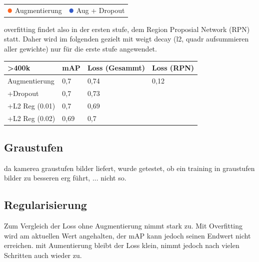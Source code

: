 \begin{table}[htb]
  \centering
  \begin{tabular}{m{}l}
    $\color[RGB]{255,100,30}\medbullet$  Augmentierung & $\color[RGB]{50,90,200}\medbullet$  Aug + Dropout
  \end{tabular}    
\end{table}

\vspace{1cm}

overfitting findet also in der ersten stufe, dem Region Proposial Network (RPN) statt.
Daher wird im folgenden gezielt mit weigt decay (l2, quadr aufsummieren aller gewichte)
nur für die erste stufe angewendet.


\begin{table}[htb]
  \centering
  \begin{tabular}{|m{}<{\centering}|m{}<{\centering}m{}<{\centering}m{}<{\centering}|}
  \hline
  \textgreater 400k & mAP  & Loss (Gesammt) & Loss (RPN) \\ \hline
  Augmentierung     & 0,7  & 0,74           &  0,12          \\
  +Dropout          & 0,7  & 0,73           &            \\
  +L2 Reg (0.01)    & 0,7  & 0,69           &            \\
  +L2 Reg (0.02)    & 0,69 & 0,7            &            \\ \hline
  \end{tabular}
\end{table}

\subsection{Graustufen}
da kamerea graustufen bilder liefert, wurde getestet, ob ein 
training in graustufen bilder zu besseren erg führt, ... nicht so.



\subsection{Regularisierung}\label{subsec:regularisierung}


Zum Vergleich der Loss ohne Augmentierung nimmt stark zu. Mit Overfitting 
wird am aktuellen Wert angehalten, der mAP kann jedoch seinen Endwert nicht 
erreichen. mit Aumentierung bleibt der Loss klein, nimmt jedoch nach
vielen Schritten auch wieder zu.





